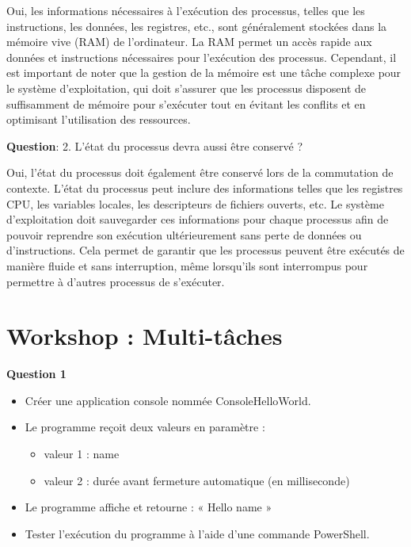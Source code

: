 \noindent Oui, les informations nécessaires à l'exécution des processus, telles que les instructions, les données, les registres, etc., sont généralement stockées dans la mémoire vive (RAM) de l'ordinateur. La RAM permet un accès rapide aux données et instructions nécessaires pour l'exécution des processus. Cependant, il est important de noter que la gestion de la mémoire est une tâche complexe pour le système d'exploitation, qui doit s'assurer que les processus disposent de suffisamment de mémoire pour s'exécuter tout en évitant les conflits et en optimisant l'utilisation des ressources.

\vspace{0.5cm}

\noindent \textbf{Question}: 2. L'état du processus devra aussi être conservé ?

\noindent Oui, l'état du processus doit également être conservé lors de la commutation de contexte. L'état du processus peut inclure des informations telles que les registres CPU, les variables locales, les descripteurs de fichiers ouverts, etc. Le système d'exploitation doit sauvegarder ces informations pour chaque processus afin de pouvoir reprendre son exécution ultérieurement sans perte de données ou d'instructions. Cela permet de garantir que les processus peuvent être exécutés de manière fluide et sans interruption, même lorsqu'ils sont interrompus pour permettre à d'autres processus de s'exécuter.

\newpage

\section*{Workshop : Multi-tâches}

\noindent \textbf{Question 1}

\begin{itemize}
	\item Créer une application console nommée ConsoleHelloWorld.
	\item Le programme reçoit deux valeurs en paramètre :
	\begin{itemize}
		\item valeur 1 : name
		\item valeur 2 : durée avant fermeture automatique (en milliseconde)
	\end{itemize}
	\item Le programme affiche et retourne : « Hello {name} »
	\item Tester l'exécution du programme à l'aide d'une commande PowerShell.
\end{itemize}

